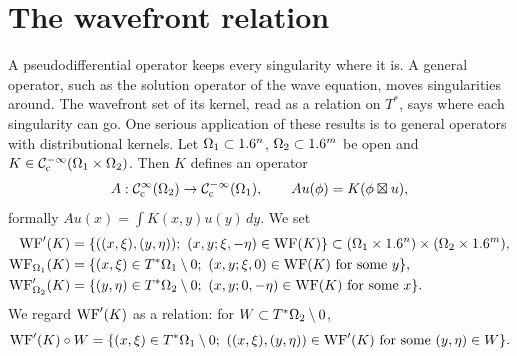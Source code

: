 \section{The wavefront relation}\label{microlocal:sec:relation}

A pseudodifferential operator keeps every singularity where it is. A general
operator, such as the solution operator of the wave equation, moves
singularities around. The wavefront set of its kernel, read as a relation on
$T^*$, says where each singularity can go. One serious application of these results is to general operators with
distributional kernels. Let $\Omega_1\subset1.6^n$, $\Omega_2\subset1.6^m$ be open
and $K\in\mathcal{C}^{-\infty}_{\mathrm{c}}(\Omega_1\times\Omega_2)$. Then $K$ defines an operator
\begin{equation*}
  A:\mathcal{C}^\infty_{\mathrm{c}}(\Omega_2)\to\mathcal{C}^{-\infty}_{\mathrm{c}}(\Omega_1),\qquad Au(\phi)=K(\phi\boxtimes u),
\end{equation*}
formally $Au(x)=\int K(x,y)u(y)\,dy$. We set
\begin{align*}
  \WFp(K)&=\{((x,\xi),(y,\eta));\ (x,y;\xi,-\eta)\in\WF(K)\}
  \subset(\Omega_1\times\R^n)\times(\Omega_2\times\R^m),\\
  \WF_{\Omega_1}(K)&=\{(x,\xi)\in\Tz{\Omega_1};\ (x,y;\xi,0)\in\WF(K)\text{ for some }y\},\\
  \WFp_{\Omega_2}(K)&=\{(y,\eta)\in\Tz{\Omega_2};\ (x,y;0,-\eta)\in\WF(K)\text{ for some }x\}.
\end{align*}
We regard $\operatorname{WF}'(K)$ as a relation: for $W\subset T^*\Omega_2\setminus0$,
\begin{equation*}
  \WFp(K)\circ W=\{(x,\xi)\in\Tz{\Omega_1};\ ((x,\xi),(y,\eta))\in\WFp(K)
  \text{ for some }(y,\eta)\in W\}.
\end{equation*}

